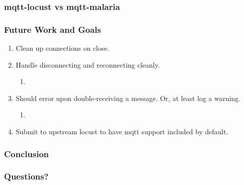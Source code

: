 \documentclass{beamer}
\begin{document}
\begin{frame}
    \frametitle{mqtt-locust vs mqtt-malaria}
\end{frame}

\begin{frame}
    \frametitle{Future Work and Goals}
    \begin{enumerate}
        \item
            Clean up connections on close.
        \item
            Handle disconnecting and reconnecting cleanly.
            \begin{enumerate}
                \item
            \end{enumerate}
        \item
            Should error upon double-receiving a message. Or, at least log a
            warning.
            \begin{enumerate}
                \item
            \end{enumerate}
        \item
            Submit to upstream locust to have mqtt support included by default.
    \end{enumerate}
\end{frame}

\begin{frame}
    \frametitle{Conclusion}
\end{frame}

\begin{frame}
    \frametitle{Questions?}
\end{frame}
\end{document}

